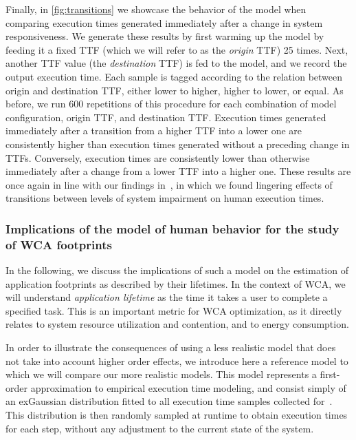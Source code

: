 Finally, in \cref{fig:transitions} we showcase the behavior of the model when comparing execution times generated immediately after a change in system responsiveness.
We generate these results by first warming up the model by feeding it a fixed \gls{TTF} (which we will refer to as the \emph{origin} \gls{TTF}) \num{25} times.
Next, another \gls{TTF} value (the \emph{destination} \gls{TTF}) is fed to the model, and we record the output execution time.
Each sample is tagged according to the relation between origin and destination \gls{TTF}, either lower to higher, higher to lower, or equal.
As before, we run \num{600} repetitions of this procedure for each combination of model configuration, origin \gls{TTF}, and destination \gls{TTF}.
Execution times generated immediately after a transition from a higher \gls{TTF} into a lower one are consistently higher than execution times generated without a preceding change in \glspl{TTF}.
Conversely, execution times are consistently lower than otherwise immediately after a change from a lower \gls{TTF} into a higher one.
These results are once again in line with our findings in~\cite{olguinmunoz2021impact}, in which we found lingering effects of transitions between levels of system impairment on human execution times.

\subsubsection{Implications of the model of human behavior for the study of \gls{WCA} footprints}\label{sec:implications:footprint}

In the following, we discuss the implications of such a model on the estimation of application footprints as described by their lifetimes.
In the context of \gls{WCA}, we will understand \emph{application lifetime} as the time it takes a user to complete a specified task.
This is an important metric for \gls{WCA} optimization, as it directly relates to system resource utilization and contention, and to energy consumption.

In order to illustrate the consequences of using a less realistic model that does not take into account higher order effects, we introduce here a reference model to which we will compare our more realistic models.
This model represents a first-order approximation to empirical execution time modeling, and consist simply of an \gls{exGaussian} distribution fitted to all execution time samples collected for~\cite{olguinmunoz2021impact}.
This distribution is then randomly sampled at runtime to obtain execution times for each step, without any adjustment to the current state of the system.

